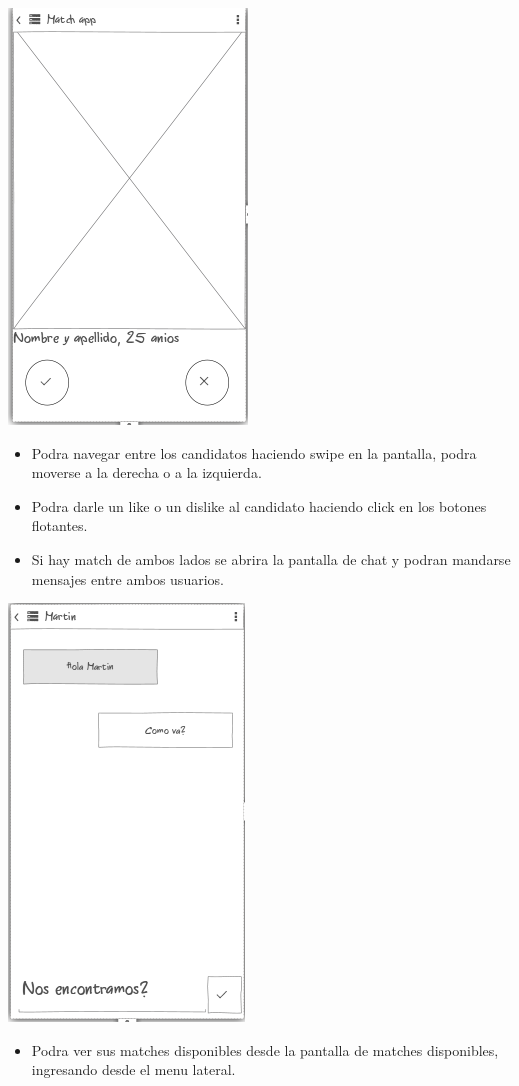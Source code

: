 \documentclass[letterpaper,10pt,english]{sphinxmanual}
\begin{document}
\includegraphics{match.png}
\begin{itemize}
\item {} 
Podra navegar entre los candidatos haciendo swipe en la pantalla, podra moverse a la derecha o a la izquierda.

\item {} 
Podra darle un like o un dislike al candidato haciendo click en los botones flotantes.

\item {} 
Si hay match de ambos lados se abrira la pantalla de chat y podran mandarse mensajes entre ambos usuarios.

\end{itemize}

\includegraphics{chat.png}
\begin{itemize}
\item {} 
Podra ver sus matches disponibles desde la pantalla de matches disponibles, ingresando desde el menu lateral.

\end{itemize}
\end{document}
